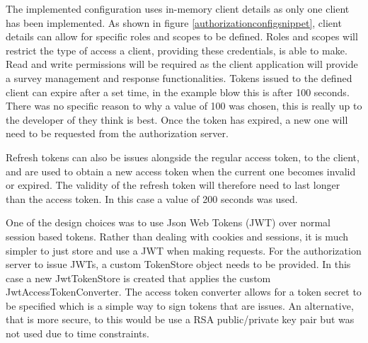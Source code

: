 The implemented configuration uses in-memory client details as only one client has been implemented.
As shown in figure \ref{authorizationconfigsnippet}, client details can allow for specific roles and scopes to be defined.
Roles and scopes will restrict the type of access a client, providing these credentials, is able to make.
Read and write permissions will be required as the client application will provide a survey management and response functionalities.
Tokens issued to the defined client can expire after a set time, in the example blow this is after 100 seconds.
There was no specific reason to why a value of 100 was chosen, this is really up to the developer of they think is best.
Once the token has expired, a new one will need to be requested from the authorization server.

Refresh tokens can also be issues alongside the regular access token, to the client, and are used to obtain a new access token when 
the current one becomes invalid or expired. 
The validity of the refresh token will therefore need to last longer than the access token.
In this case a value of 200 seconds was used. 

One of the design choices was to use Json Web Tokens (JWT) over normal session based tokens.
Rather than dealing with cookies and sessions, it is much simpler to just store and use a JWT when making requests.
For the authorization server to issue JWTs, a custom TokenStore object needs to be provided.
In this case a new JwtTokenStore is created that applies the custom JwtAccessTokenConverter.
The access token converter allows for a token secret to be specified which is a simple way to sign tokens that are issues.
An alternative, that is more secure, to this would be use a RSA public/private key pair but was not used due to time constraints.

